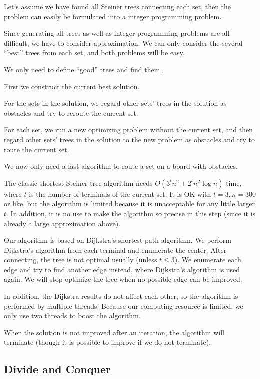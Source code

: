 \documentclass[12pt, a4paper]{article}
\begin{document}
	Let's assume we have found all Steiner trees connecting each set, then the problem can easily be formulated into a integer programming problem.
	
	Since generating all trees as well as integer programming problems are all difficult, we have to consider approximation. We can only consider the several ``best'' trees from each set, and both problems will be easy.
	
	We only need to define ``good'' trees and find them.
	
	First we construct the current best solution.
	
	For the sets in the solution, we regard other sets' trees in the solution as obstacles and try to reroute the current set.
	
	For each set, we run a new optimizing problem without the current set, and then regard other sets' trees in the solution to the new problem as obstacles and try to route the current set.
	
	We now only need a fast algorithm to route a set on a board with obstacles.
	
	The classic shortest Steiner tree algorithm needs $O(3^t n^2 + 2^t n^2 \log n)$ time, where $t$ is the number of terminals of the current set. It is OK with $t = 3, n = 300$ or like, but the algorithm is limited because it is unacceptable for any little larger $t$. In addition, it is no use to make the algorithm so precise in this step (since it is already a large approximation above).
	
	Our algorithm is based on Dijkstra's shortest path algorithm. We perform Dijkstra's algorithm from each terminal and enumerate the center. After connecting, the tree is not optimal usually (unless $t \leq 3$). We enumerate each edge and try to find another edge instead, where Dijkstra's algorithm is used again. We will stop optimize the tree when no possible edge can be improved.
	
	In addition, the Dijkstra results do not affect each other, so the algorithm is performed by multiple threads. Because our computing resource is limited, we only use two threads to boost the algorithm.
	
	When the solution is not improved after an iteration, the algorithm will terminate (though it is possible to improve if we do not terminate).
	
	\subsection{Divide and Conquer}
	
\end{document}
